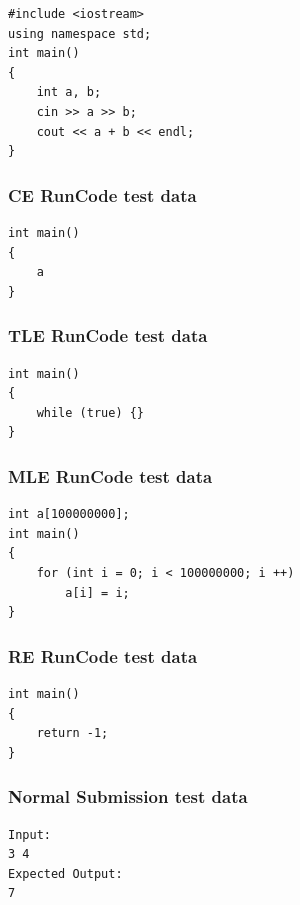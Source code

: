 \documentclass[a4paper]{report}
\begin{document}
\begin{verbatim}
#include <iostream>
using namespace std;
int main()
{
    int a, b;
    cin >> a >> b;
    cout << a + b << endl;
}
\end{verbatim}

\subsubsection{CE RunCode test data}

\begin{verbatim}
int main()
{
    a
}
\end{verbatim}

\subsubsection{TLE RunCode test data}

\begin{verbatim}
int main()
{
    while (true) {}
}
\end{verbatim}

\subsubsection{MLE RunCode test data}

\begin{verbatim}
int a[100000000];
int main()
{
    for (int i = 0; i < 100000000; i ++)
        a[i] = i;
}
\end{verbatim}

\subsubsection{RE RunCode test data}

\begin{verbatim}
int main()
{
    return -1;
}
\end{verbatim}

\subsubsection{Normal Submission test data}

\begin{verbatim}
Input:
3 4
Expected Output:
7 
\end{verbatim}
\end{document}
